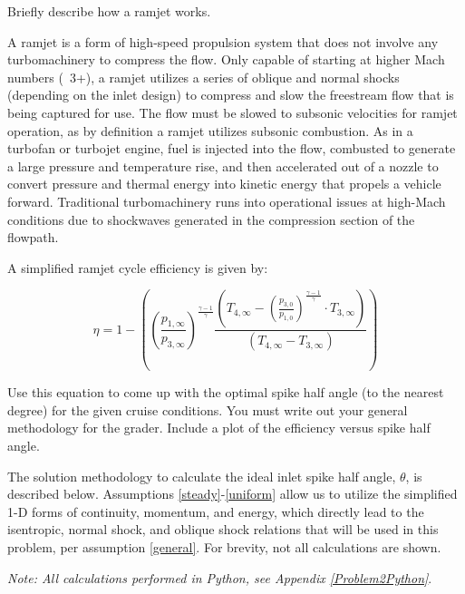 \documentclass[../main.tex]{subfiles}
\begin{document}
Briefly describe how a ramjet works.

\discussion{}
A ramjet is a form of high-speed propulsion system that does not involve any turbomachinery to compress the flow.
Only capable of starting at higher Mach numbers (~3+), a ramjet utilizes a series of oblique and normal shocks (depending on the inlet design) to compress and slow the freestream flow that is being captured for use.
The flow must be slowed to subsonic velocities for ramjet operation, as by definition a ramjet utilizes subsonic combustion.
As in a turbofan or turbojet engine, fuel is injected into the flow, combusted to generate a large pressure and temperature rise, and then accelerated out of a nozzle to convert pressure and thermal energy into kinetic energy that propels a vehicle forward.
Traditional turbomachinery runs into operational issues at high-Mach conditions due to shockwaves generated in the compression section of the flowpath.


A simplified ramjet cycle efficiency is given by:

\[
    \eta = 1 - \left({
    \left({\frac{p_{1,\infty}}{p_{3,\infty}}}\right)^{\frac{\gamma-1}{\gamma}}
    \frac{
        \left({T_{4,\infty} - \left({\frac{p_{3,0}}{p_{1,0}}}\right)^{{\frac{\gamma-1}{\gamma}}}} \cdot T_{3,\infty}\right)
    }{\left({T_{4,\infty}-T_{3,\infty}}\right)}
    }\right)
\]

Use this equation to come up with the optimal spike half angle (to the nearest degree) for the given cruise conditions. 
You must write out your general methodology for the grader.
Include a plot of the efficiency versus spike half angle.

\solution{}

The solution methodology to calculate the ideal inlet spike half angle, \(\theta\), is described below. 
Assumptions \ref{steady}-\ref{uniform} allow us to utilize the simplified 1-D forms of continuity, momentum, and energy, which directly lead to the isentropic, normal shock, and oblique shock relations that will be used in this problem, per assumption \ref{general}.
For brevity, not all calculations are shown.

\textit{Note: All calculations performed in Python, see Appendix \ref{Problem2Python}}.
\end{document}
